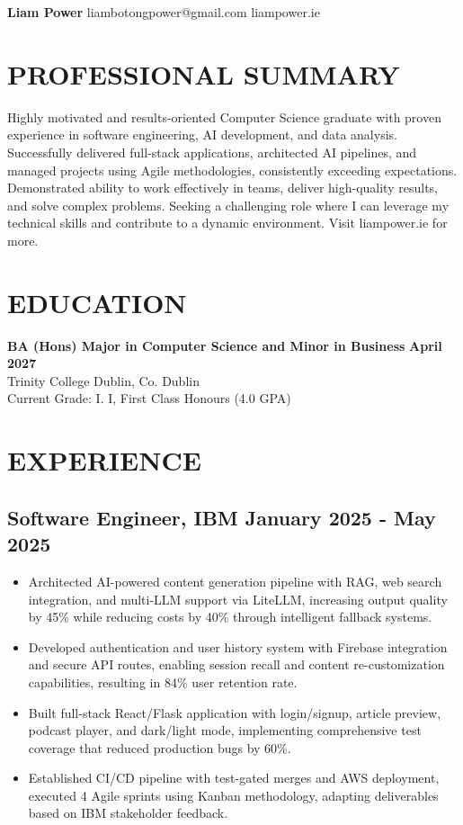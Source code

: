 \documentclass[10pt,a4paper]{article}
\begin{document}
\begin{center}
{\large\bfseries Liam Power} \hfill {\large liambotongpower@gmail.com} \hfill {\large liampower.ie}
\end{center}

\section{PROFESSIONAL SUMMARY} 

Highly motivated and results-oriented Computer Science graduate with proven experience in software engineering, AI development, and data analysis. Successfully delivered full-stack applications, architected AI pipelines, and managed projects using Agile methodologies, consistently exceeding expectations. Demonstrated ability to work effectively in teams, deliver high-quality results, and solve complex problems. Seeking a challenging role where I can leverage my technical skills and contribute to a dynamic environment. Visit liampower.ie for more.


\section{EDUCATION}

\textbf{BA (Hons) Major in Computer Science and Minor in Business} \hfill \textbf{April 2027}\\
Trinity College Dublin, Co. Dublin\\
Current Grade: I. I, First Class Honours (4.0 GPA)

\section{EXPERIENCE}

\subsection{Software Engineer, IBM \hfill January 2025 - May 2025}
\begin{itemize}
\item Architected AI-powered content generation pipeline with RAG, web search integration, and multi-LLM support via LiteLLM, increasing output quality by 45\% while reducing costs by 40\% through intelligent fallback systems.
\item Developed authentication and user history system with Firebase integration and secure API routes, enabling session recall and content re-customization capabilities, resulting in 84\% user retention rate.
\item Built full-stack React/Flask application with login/signup, article preview, podcast player, and dark/light mode, implementing comprehensive test coverage that reduced production bugs by 60\%.
\item Established CI/CD pipeline with test-gated merges and AWS deployment, executed 4 Agile sprints using Kanban methodology, adapting deliverables based on IBM stakeholder feedback.
\end{itemize}
\end{document}
